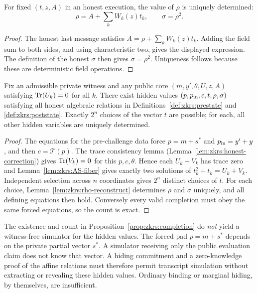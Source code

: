 \begin{lemma}\label{lem:zkrs:rho-reconstruct}
For fixed $(t,z,A)$ in an honest execution, the value
of $\rho$ is uniquely determined:
\[
 \boxed{\rho=A+\sum_kW_k(z)t_k,\qquad \sigma=\rho^2.}
\]
\end{lemma}
\begin{proof}
The honest last message satisfies
$A=\rho+\sum_kW_k(z)t_k$.
Adding the field sum to both sides,
and using characteristic two, gives
the displayed expression. The
definition of the honest $\sigma$
then gives $\sigma=\rho^2$.
Uniqueness follows because these are
deterministic field operations.
\end{proof}

\begin{proposition}\label{prop:zkrs:completion}
Fix an admissible private witness and any
public core $(m,y',\theta,U,z,A)$ satisfying
$\operatorname{Tr}(U_k)=0$ for all $k$.
There exist hidden values
$(p,p_{\rm in},c,t,\rho,\sigma)$ satisfying
all honest algebraic relations in
Definitions~\ref{def:zkrs:prestate} and
\ref{def:zkrs:poststate}.
Exactly $2^n$ choices of the vector $t$
are possible; for each, all other hidden
variables are uniquely determined.
\end{proposition}
\begin{proof}
The equations for the pre-challenge data
force
$p=m+s^*$ and $p_{\rm in}=y'+y$,
and then $c=\mathcal T(p)$.
The trace consistency lemma
(Lemma~\ref{lem:zkrs:honest-correction})
gives $\operatorname{Tr}(V_k)=0$ for this $p,c,\theta$.
Hence each $U_k+V_k$ has trace zero and
Lemma~\ref{lem:zkrs:AS-fiber} gives exactly
two solutions of
$t_k^2+t_k=U_k+V_k$.
Independent selection across $n$ coordinates
gives $2^n$ distinct choices of $t$.
For each choice, Lemma~\ref{lem:zkrs:rho-reconstruct}
determines $\rho$ and $\sigma$ uniquely,
and all defining equations then hold.
Conversely every valid completion must obey
the same forced equations, so the count is exact.
\end{proof}

\begin{remark}
The existence and count in
Proposition~\ref{prop:zkrs:completion}
do \emph{not} yield a witness-free
simulator for the hidden values.
The forced pad $p=m+s^*$ depends on
the private partial vector $s^*$.
A simulator receiving only the public
evaluation claim does not know that vector.
A hiding commitment and a zero-knowledge
proof of the affine relations must therefore
permit transcript simulation without
extracting or revealing these hidden
values. Ordinary binding or marginal
hiding, by themselves, are insufficient.
\end{remark}

